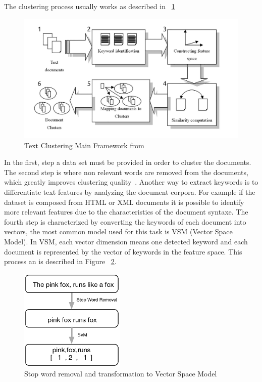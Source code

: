 The clustering process usually works as described in ~\ref{fig:1_Text_Clustering_Main_Framwork}
\begin{figure}
  \begin{center}
    \includegraphics[width=12cm]{images/1_Text_Clustering_Main_Framwork.png}
  \end{center}
  \caption{ Text Clustering Main Framework from~\citet{Dozono2012} }
  \label{fig:1_Text_Clustering_Main_Framwork}
\end{figure}
In the first, step a data set must be provided in order to cluster the documents. 
The second step is where non relevant words are removed from the documents, which greatly improves clustering quality~\cite{Kang2003}. Another way to extract keywords is to differentiate text features by analyzing the document corpora. For example if the dataset is composed from HTML or XML documents it is possible to identify more relevant features due to the characteristics of the document syntaxe.
The fourth step is characterized by converting the keywords of each document into vectors, the most common model used for this task is VSM (Vector Space Model). In VSM, each vector dimension means one detected keyword and each document is represented by the vector of keywords in the feature space. This process an is described in Figure ~\ref{fig:2_svm}.

\begin{figure}
  \begin{center}
    \includegraphics[width=5cm]{images/2_svm.eps}
  \end{center}
  \caption{ Stop word removal and transformation to Vector Space Model }
  \label{fig:2_svm}
\end{figure}


